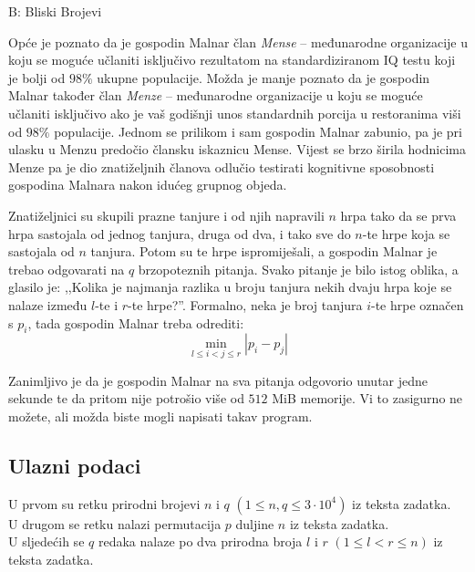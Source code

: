 \begin{statement}[
  timelimit=2 s,
  memorylimit=512 MiB,
]{B: Bliski Brojevi}

Opće je poznato da je gospodin Malnar član \textit{Mense} -- međunarodne
organizacije u koju se moguće učlaniti isključivo rezultatom na standardiziranom
IQ testu koji je bolji od $98\%$ ukupne populacije. Možda je manje poznato da je
gospodin Malnar također član \textit{Menze} -- međunarodne organizacije u koju
se moguće učlaniti isključivo ako je vaš godišnji unos standardnih porcija u
restoranima viši od $98\%$ populacije. Jednom se prilikom i sam gospodin Malnar
zabunio, pa je pri ulasku u Menzu predočio člansku iskaznicu Mense. Vijest se
brzo širila hodnicima Menze pa je dio znatiželjnih članova odlučio testirati
kognitivne sposobnosti gospodina Malnara nakon idućeg grupnog objeda.

Znatiželjnici su skupili prazne tanjure i od njih napravili $n$ hrpa tako
da se prva hrpa sastojala od jednog tanjura, druga od dva, i tako sve do
$n$-te hrpe koja se sastojala od $n$ tanjura. Potom su te hrpe ispromiješali, a
gospodin Malnar je trebao odgovarati na $q$ brzopoteznih pitanja. Svako pitanje
je bilo istog oblika, a glasilo je: ,,Kolika je najmanja razlika u broju tanjura
nekih dvaju hrpa koje se nalaze između $l$-te i $r$-te hrpe?''. Formalno, neka
je broj tanjura $i$-te hrpe označen s $p_i$, tada gospodin Malnar treba odrediti:
$$\min_{l \le i < j \le r}{|p_i - p_j|}$$

Zanimljivo je da je gospodin Malnar na sva pitanja odgovorio unutar jedne
sekunde te da pritom nije potrošio više od $512$ MiB memorije. Vi to
zasigurno ne možete, ali možda biste mogli napisati takav program.

\subsection*{Ulazni podaci}
U prvom su retku prirodni brojevi $n$ i $q$ $(1 \le n, q \le 3 \cdot 10^4)$ iz
teksta zadatka.\\
U drugom se retku nalazi permutacija $p$ duljine $n$ iz teksta zadatka.\\
U sljedećih se $q$ redaka nalaze po dva prirodna broja $l$ i $r$
$(1 \le l < r \le n)$ iz teksta zadatka.


\end{statement}
